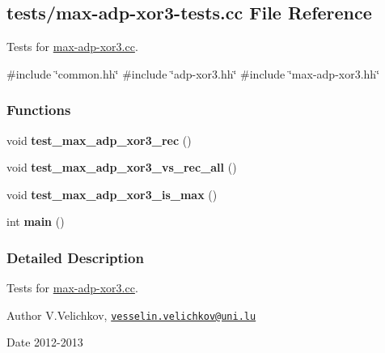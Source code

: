 \hypertarget{max-adp-xor3-tests_8cc}{\subsection{tests/max-\/adp-\/xor3-\/tests.cc \-File \-Reference}
\label{max-adp-xor3-tests_8cc}
}


\-Tests for \hyperlink{max-adp-xor3_8cc}{max-\/adp-\/xor3.\-cc}.  


{\ttfamily \#include \char`\"{}common.\-hh\char`\"{}}\*
{\ttfamily \#include \char`\"{}adp-\/xor3.\-hh\char`\"{}}\*
{\ttfamily \#include \char`\"{}max-\/adp-\/xor3.\-hh\char`\"{}}\*
\subsubsection*{\-Functions}
\begin{DoxyCompactItemize}
\item 
\hypertarget{max-adp-xor3-tests_8cc_a419d753bc7a003c49501bb0fc3a33328}{void {\bfseries test\-\_\-max\-\_\-adp\-\_\-xor3\-\_\-rec} ()}\label{max-adp-xor3-tests_8cc_a419d753bc7a003c49501bb0fc3a33328}

\item 
\hypertarget{max-adp-xor3-tests_8cc_adbe01c9e4c217a40163d3cfaa2179a1e}{void {\bfseries test\-\_\-max\-\_\-adp\-\_\-xor3\-\_\-vs\-\_\-rec\-\_\-all} ()}\label{max-adp-xor3-tests_8cc_adbe01c9e4c217a40163d3cfaa2179a1e}

\item 
\hypertarget{max-adp-xor3-tests_8cc_abaf3b1b961a2504ca3ea406fce5b87c2}{void {\bfseries test\-\_\-max\-\_\-adp\-\_\-xor3\-\_\-is\-\_\-max} ()}\label{max-adp-xor3-tests_8cc_abaf3b1b961a2504ca3ea406fce5b87c2}

\item 
\hypertarget{max-adp-xor3-tests_8cc_ae66f6b31b5ad750f1fe042a706a4e3d4}{int {\bfseries main} ()}\label{max-adp-xor3-tests_8cc_ae66f6b31b5ad750f1fe042a706a4e3d4}

\end{DoxyCompactItemize}


\subsubsection{\-Detailed \-Description}
\-Tests for \hyperlink{max-adp-xor3_8cc}{max-\/adp-\/xor3.\-cc}. \begin{DoxyAuthor}{\-Author}
\-V.\-Velichkov, \href{mailto:vesselin.velichkov@uni.lu}{\tt vesselin.\-velichkov@uni.\-lu} 
\end{DoxyAuthor}
\begin{DoxyDate}{\-Date}
2012-\/2013 
\end{DoxyDate}
